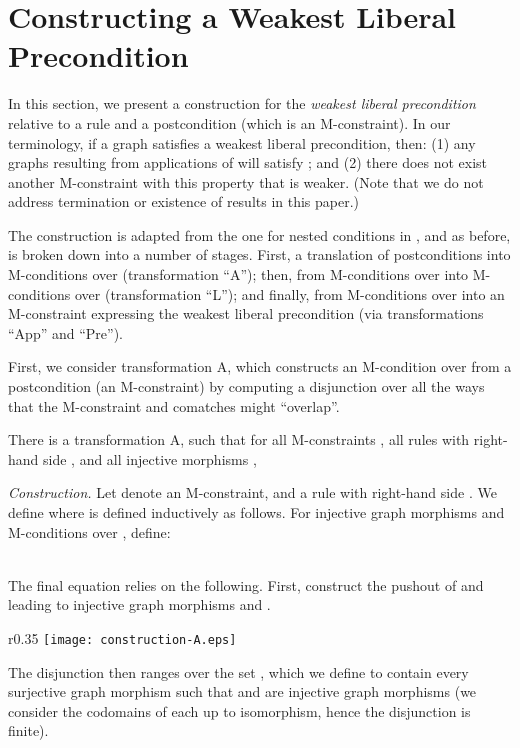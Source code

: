 \documentclass{llncs}
\begin{document}
	
	
	
	
\section{Constructing a Weakest Liberal Precondition}\label{sec:constructing_wlps}
	
In this section, we present a construction for the \emph{weakest liberal precondition} relative to a rule  and a postcondition  (which is an M-constraint). In our terminology, if a graph satisfies a weakest liberal precondition, then: (1) any graphs resulting from applications of  will satisfy ; and (2) there does not exist another M-constraint with this property that is weaker. (Note that we do not address termination or existence of results in this paper.)

The construction is adapted from the one for nested conditions in \cite{Habel-Pennemann09a}, and as before, is broken down into a number of stages. First, a translation of postconditions into M-conditions over  (transformation ``A''); then, from M-conditions over  into M-conditions over  (transformation ``L''); and finally, from M-conditions over  into an M-constraint expressing the weakest liberal precondition (via transformations ``App'' and ``Pre'').

First, we consider transformation A, which constructs an M-condition over  from a postcondition (an M-constraint) by computing a disjunction over all the ways that the M-constraint and comatches might ``overlap''.

\begin{theorem}\label{thm:A}\rm
	There is a transformation A, such that for all M-constraints , all rules  with right-hand side , and all injective morphisms ,
	
\end{theorem}

\noindent	\emph{Construction.} Let  denote an M-constraint, and  a rule with right-hand side . We define  where  is defined inductively as follows. For injective graph morphisms  and M-conditions over , define:


	\\


	

	\noindent	The final equation relies on the following. First, construct the pushout  of  and  leading to injective graph morphisms  and .

\begin{wrapfigure}[10]{r}{0.35\textwidth}
	\centering
		\vspace{-25pt}
		\texttt{[image: construction-A.eps]}
\end{wrapfigure}
	\noindent The disjunction then ranges over the set , which we define to contain every surjective graph morphism  such that  and  are injective graph morphisms (we consider the codomains of each  up to isomorphism, hence the disjunction is finite).
\end{document}
